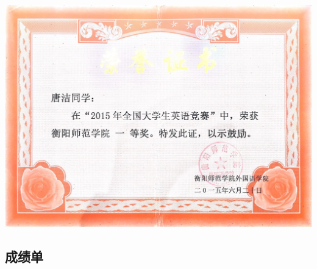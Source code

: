 \documentclass[UFT8]{ctexart}%
\begin{document}
\begin{center}
 \includegraphics[scale=0.2]{figs/2015-06.jpg }
\end{center}



\subsection{成绩单}



\end{document}
